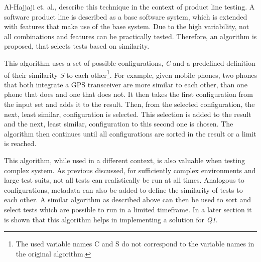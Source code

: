 Al-Hajjaji et. al., describe this technique in the context of product line testing\cite{SimilarityBasedPrioritizationInSoftwareProductLineTesting}.
A software product line is described as a base software system, which is extended with features that make use of the base system.
Due to the high variability, not all combinations and features can be practically tested.
Therefore, an algorithm is proposed, that selects tests based on similarity.

This algorithm uses a set of possible configurations, \textit{C} and a predefined definition of their similarity \textit{S} to each other\footnote{The used variable names C and S do not correspond to the variable names in the original algorithm.}.
For example, given mobile phones, two phones that both integrate a GPS transceiver are more similar to each other, than one phone that does and one that does not.
It then takes the first configuration from the input set and adds it to the result.
Then, from the selected configuration, the next, least similar, configuration is selected.
This selection is added to the result and the next, least similar, configuration to this second one is chosen.
The algorithm then continues until all configurations are sorted in the result or a limit is reached.

This algorithm, while used in a different context, is also valuable when testing complex system.
As previous discussed, for sufficiently complex environments and large test suits, not all tests can realistically be run at all times.
Analogous to configurations, metadata can also be added to define the similarity of tests to each other.
A similar algorithm as described above can then be used to sort and select tests which are possible to run in a limited timeframe.
In a later section it is shown that this algorithm helps in implementing a solution for \textit{Q1}. %

